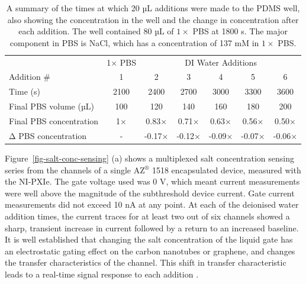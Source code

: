\documentclass[
  a4paper,
]{scrbook}
\begin{document}
\hypertarget{tbl-salt-conc-series}{}
\begin{longtable}[t]{lcccccc}
\caption{\label{tbl-salt-conc-series}A summary of the times at which 20 µL additions were made to the PDMS
well, also showing the concentration in the well and the change in
concentration after each addition. The well contained 80 µL of
\(1 \times\) PBS at 1800 s. The major component in PBS is NaCl, which
has a concentration of 137 mM in \(1 \times\) PBS. }\tabularnewline

\toprule
\multicolumn{1}{c}{ } & \multicolumn{1}{c}{1× PBS} & \multicolumn{5}{c}{DI Water Additions} \\
\cmidrule(l{3pt}r{3pt}){2-2} \cmidrule(l{3pt}r{3pt}){3-7}
Addition \# & 1 & 2 & 3 & 4 & 5 & 6\\
\midrule
Time (s) & 2100 & 2400 & 2700 & 3000 & 3300 & 3600\\
Final PBS volume (µL) & 100 & 120 & 140 & 160 & 180 & 200\\
Final PBS concentration & 1× & 0.83× & 0.71× & 0.63× & 0.56× & 0.50×\\
Δ PBS concentration & - & -0.17× & -0.12× & -0.09× & -0.07× & -0.06×\\
\bottomrule
\end{longtable}

Figure~\ref{fig-salt-conc-sensing} (a) shows a multiplexed salt
concentration sensing series from the channels of a single
AZ\(^\circledR\) 1518 encapsulated device, measured with the NI-PXIe.
The gate voltage used was 0 V, which meant current measurements were
well above the magnitude of the subthreshold device current. Gate
current measurements did not exceed 10 nA at any point. At each of the
deionised water addition times, the current traces for at least two out
of six channels showed a sharp, transient increase in current followed
by a return to an increased baseline. It is well established that
changing the salt concentration of the liquid gate has an electrostatic
gating effect on the carbon nanotubes or graphene, and changes the
transfer characteristics of the channel. This shift in transfer
characteristic leads to a real-time signal response to each addition
\autocite{Heller2009,Heller2010,Kireev2017}.
\end{document}
